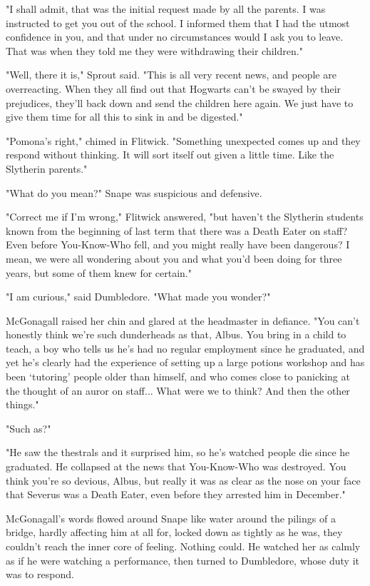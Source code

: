 "I shall admit, that was the initial request made by all the parents. I was instructed to get you out of the school. I informed them that I had the utmost confidence in you, and that under no circumstances would I ask you to leave. That was when they told me they were withdrawing their children."

"Well, there it is," Sprout said. "This is all very recent news, and people are overreacting. When they all find out that Hogwarts can't be swayed by their prejudices, they'll back down and send the children here again. We just have to give them time for all this to sink in and be digested."

"Pomona's right," chimed in Flitwick. "Something unexpected comes up and they respond without thinking. It will sort itself out given a little time. Like the Slytherin parents."

"What do you mean?" Snape was suspicious and defensive.

"Correct me if I'm wrong," Flitwick answered, "but haven't the Slytherin students known from the beginning of last term that there was a Death Eater on staff? Even before You-Know-Who fell, and you might really have been dangerous? I mean, we were all wondering about you and what you'd been doing for three years, but some of them knew for certain."

"I am curious," said Dumbledore. "What made you wonder?"

McGonagall raised her chin and glared at the headmaster in defiance. "You can't honestly think we're such dunderheads as that, Albus. You bring in a child to teach, a boy who tells us he's had no regular employment since he graduated, and yet he's clearly had the experience of setting up a large potions workshop and has been `tutoring' people older than himself, and who comes close to panicking at the thought of an auror on staff... What were we to think? And then the other things."

"Such as?"

"He saw the thestrals and it surprised him, so he's watched people die since he graduated. He collapsed at the news that You-Know-Who was destroyed. You think you're so devious, Albus, but really it was as clear as the nose on your face that Severus was a Death Eater, even before they arrested him in December."

McGonagall's words flowed around Snape like water around the pilings of a bridge, hardly affecting him at all for, locked down as tightly as he was, they couldn't reach the inner core of feeling. Nothing could. He watched her as calmly as if he were watching a performance, then turned to Dumbledore, whose duty it was to respond.

